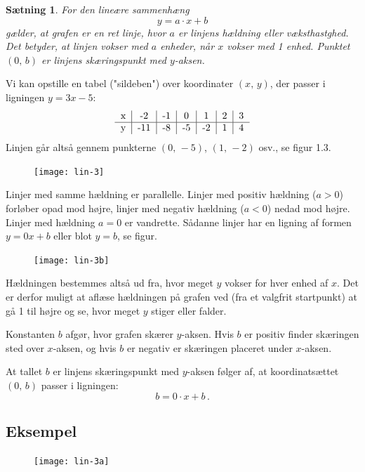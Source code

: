 \documentclass[12pt,oneside,a4paper]{article}
\newtheorem{thm}{Sætning}[section]
\begin{document}
\begin{thm}
    For den lineære sammenhæng
    $$
    y = a\cdot x + b
    $$
    gælder, at grafen er en ret linje, hvor $a$ er linjens {\em hældning} eller
    {\em væksthastghed}.  Det betyder, at linjen vokser med $a$ enheder, når
    $x$ vokser med 1 enhed.  Punktet $(0,\,b)$ er linjens {\em skæringspunkt
    med $y$-aksen}.
\end{thm}

Vi kan opstille en tabel ("sildeben") over koordinater $(x,\,y)$, der passer i
ligningen $y=3x-5$:
$$
\begin{tabular}{c|c|c|c|c|c|c}
    x &  -2 & -1 &  0 &  1 & 2 & 3 \\
    \hline
    y & -11 & -8 & -5 & -2 & 1 & 4
\end{tabular}
$$
Linjen går altså gennem punkterne $(0,\,-5)$, $(1,\,-2)$ osv., se figur 1.3.

\begin{figure}[H]
    \centering
    \texttt{[image: lin-3]}
\end{figure}

Linjer med samme hældning er parallelle. Linjer med positiv hældning ($a>0$) forløber
opad mod højre, linjer med negativ hældning ($a<0$) nedad mod højre. Linjer med
hældning $a=0$ er vandrette.  Sådanne linjer har en ligning af formen $y=0x+b$
eller blot $y=b$, se figur.

\begin{figure}[H]
    \centering
    \texttt{[image: lin-3b]}
\end{figure}

Hældningen bestemmes altså ud fra, hvor meget $y$ vokser for hver enhed af $x$. Det
er derfor muligt at aflæse hældningen på grafen ved (fra et valgfrit startpunkt)
at gå 1 til højre og se, hvor meget $y$ stiger eller falder.

Konstanten $b$ afgør, hvor grafen skærer $y$-aksen. Hvis $b$ er positiv finder
skæringen sted over $x$-aksen, og hvis $b$ er negativ er skæringen placeret under $x$-aksen.

At tallet $b$ er linjens skæringspunkt med $y$-aksen følger af, at
koordinatsættet $(0,\,b)$ passer i ligningen:
$$
b = 0\cdot x+b \,.
$$


\subsection{Eksempel}
\begin{figure}[H]
    \centering
    \texttt{[image: lin-3a]}
\end{figure}
\end{document}

